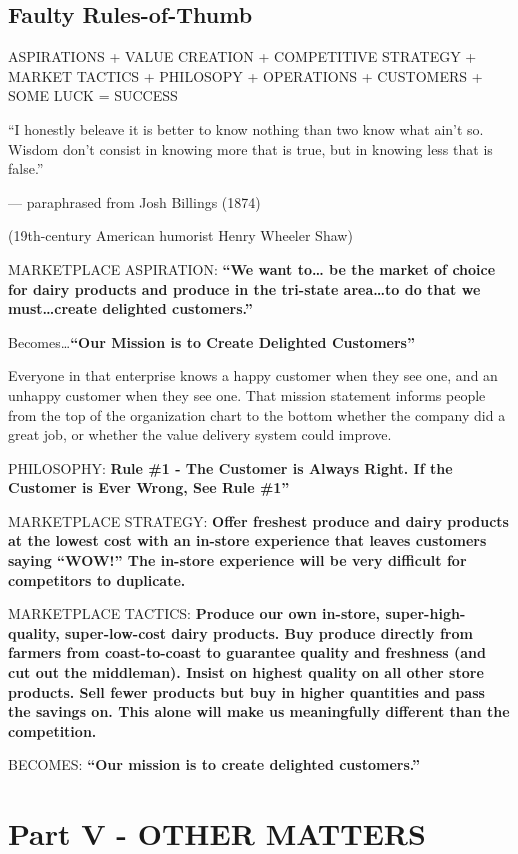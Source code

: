 \documentclass[
]{book}
\begin{document}
\hypertarget{faulty-rules-of-thumb}{%
\chapter{Faulty Rules-of-Thumb}\label{faulty-rules-of-thumb}}

{ASPIRATIONS}
{+}
{VALUE CREATION}
{+}
{COMPETITIVE STRATEGY }
{+}
{MARKET TACTICS}
{+}
{PHILOSOPY}
{+}
{OPERATIONS}
{+}
{CUSTOMERS}
{+}
{SOME LUCK}
{=}
{SUCCESS}

``I honestly beleave it is better to know nothing than two know what ain't so. Wisdom don't consist in knowing more that is true, but in knowing less that is false.''

--- paraphrased from Josh Billings (1874)

(19th-century American humorist Henry Wheeler Shaw)

{MARKETPLACE ASPIRATION: \textbf{``We want to\ldots{} be the market of choice for dairy products and produce in the tri-state area\ldots to do that we must\ldots create delighted customers.''}}

Becomes\ldots{}{\textbf{``Our Mission is to Create Delighted Customers''}}

Everyone in that enterprise knows a happy customer when they see one, and an unhappy customer when they see one. That mission statement informs people from the top of the organization chart to the bottom whether the company did a great job, or whether the value delivery system could improve.

{PHILOSOPHY:} \textbf{Rule \#1 - The Customer is Always Right. If the Customer is Ever Wrong, See Rule \#1''}

{MARKETPLACE STRATEGY:} \textbf{Offer freshest produce and dairy products at the lowest cost with an in-store experience that leaves customers saying ``WOW!'' The in-store experience will be very difficult for competitors to duplicate.}

{MARKETPLACE TACTICS:} \textbf{Produce our own in-store, super-high-quality, super-low-cost dairy products. Buy produce directly from farmers from coast-to-coast to guarantee quality and freshness (and cut out the middleman). Insist on highest quality on all other store products. Sell fewer products but buy in higher quantities and pass the savings on. This alone will make us meaningfully different than the competition.}

{BECOMES:} \textbf{``Our mission is to create delighted customers.''}

\hypertarget{part-part-v---other-matters}{%
\part*{Part V - OTHER MATTERS}\label{part-part-v---other-matters}}
\end{document}
